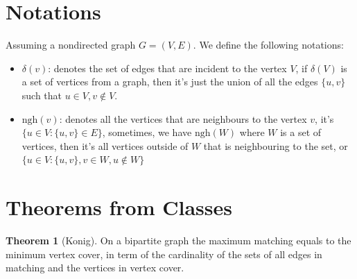 \documentclass[]{article}
\theoremstyle{definition}
\newtheorem{theorem}{Theorem}       %
\begin{document}
\section{Notations}
Assuming a nondirected graph $G = (V, E)$. We define the following notations: 
\begin{itemize}
    \item [1.] $\delta(v)$: denotes the set of edges that are incident to the vertex $V$, if $\delta(V)$ is a set of vertices from a graph, then it's just the union of all the edges $\{u, v\}$ such that $u\in V, v\not\in V$. 
    \item [2.] $\text{ngh}(v)$: denotes all the vertices that are neighbours to the vertex $v$, it's $\{u\in V: \{u, v\} \in E\}$, sometimes, we have $\text{ngh}(W)$ where $W$ is a set of vertices, then it's all vertices outside of $W$ that is neighbouring to the set, or $\{u\in V: \{u, v\}, v\in W, u \not\in W\}$
\end{itemize}
\newpage

\section{Theorems from Classes}
    \begin{theorem}[Konig]\label{theorem:konig}
        On a bipartite graph the maximum matching equals to the minimum vertex cover, in term of the cardinality of the sets of all edges in matching and the vertices in vertex cover.  
    \end{theorem}
\end{document}
